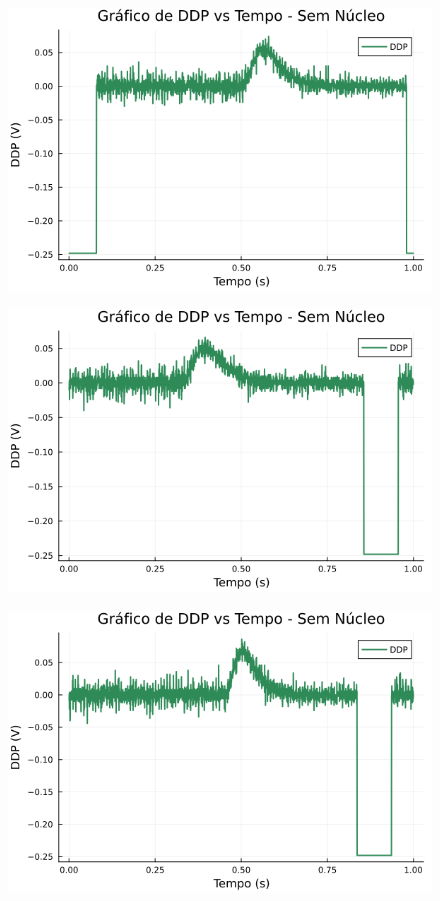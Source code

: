 \begin{center}
\begin{multicols}{2}
\begin{figure}[H]
    \centering
    \includegraphics[width=1.0\linewidth]{figuras/grafico_dados2_F0003CH1.png}
\end{figure}

\begin{figure}[H]
    \centering
    \includegraphics[width=1.0\linewidth]{figuras/grafico_dados2_F0004CH1.png}
\end{figure}

\begin{figure}[H]
    \centering
    \includegraphics[width=1.0\linewidth]{figuras/grafico_dados2_F0005CH1.png}
\end{figure}


\end{multicols}
\end{center}

